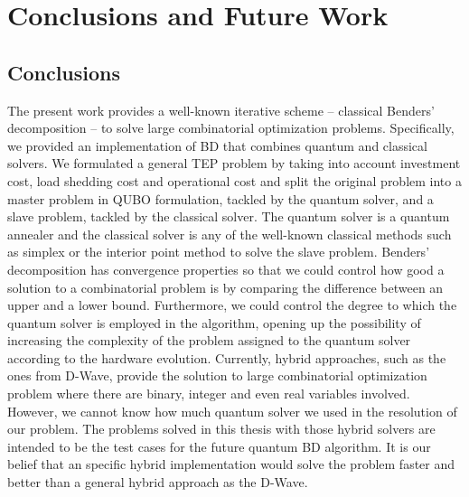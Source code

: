 
\chapter{Conclusions and Future Work} %

\label{Chapter6} %




\section{Conclusions}
The present work provides a well-known iterative scheme -- classical Benders' decomposition -- to solve large combinatorial optimization problems. Specifically, we provided an implementation of BD that combines quantum and classical solvers. We formulated a general TEP problem by taking into account investment cost, load shedding cost and operational cost and split the original problem into a master problem in QUBO formulation, tackled by the quantum solver, and a slave problem, tackled by the classical solver. The quantum solver is a quantum annealer and the classical solver is any of the well-known classical methods such as simplex or the interior point method to solve the slave problem. Benders' decomposition has convergence properties so that we could control how good a solution to a combinatorial problem is by comparing the difference between an upper and a lower bound. Furthermore, we could control the degree to which the quantum solver is employed in the algorithm, opening up the possibility of increasing the complexity of the problem assigned to the quantum solver according to the hardware evolution. Currently, hybrid approaches, such as the ones from D-Wave, provide the solution to large combinatorial optimization problem where there are binary, integer and even real variables involved. However, we cannot know how much quantum solver we used in the resolution of our problem. The problems solved in this thesis with those hybrid solvers are intended to be the test cases for the future quantum BD algorithm. It is our belief that an specific hybrid implementation would solve the problem faster and better than a general hybrid approach as the D-Wave.\\\\
